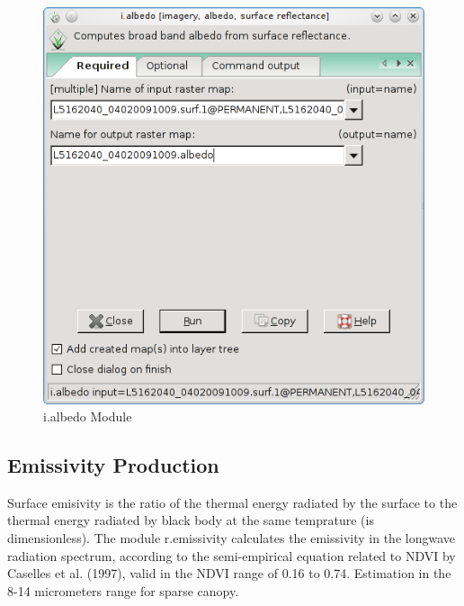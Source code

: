 \begin{figure}[htbp]
   \centering
   \includegraphics[scale=0.4]{gipe020.png}
   \caption{i.albedo Module}
   \label{fig:gipe020}
\end{figure}

\subsection{Emissivity Production}
Surface emisivity is the ratio of the thermal energy radiated by the surface to the thermal energy  radiated by black body at the same temprature (is dimensionless).\newline 
The module r.emissivity calculates the emissivity in the longwave radiation spectrum, according to the semi-empirical equation related to NDVI by Caselles et al. (1997), valid in the NDVI range of 0.16 to 0.74. Estimation in the 8-14 micrometers range for sparse canopy.\newline

